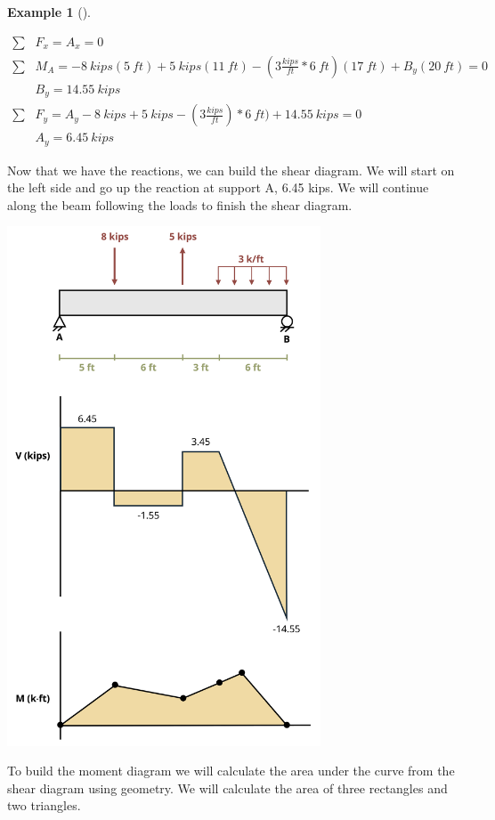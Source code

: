 \documentclass[
  letterpaper,
  DIV=11,
  numbers=noendperiod]{scrreprt}
\theoremstyle{definition}
\newtheorem{example}{Example}[chapter]
\theoremstyle{remark}
\begin{document}
\begin{tcolorbox}
\begin{example}[]
\begin{tcolorbox}
\[
\begin{aligned}
\sum& F_x =A_x =0\\
\sum& M_A =-8{~kips}(5{~ft})+5{~kips}(11{~ft})-(3\frac{kips}{ft}*6{~ft})(17{~ft})+B_y(20{~ft})=0 \\
&B_y =14.55{~kips} \\
\sum& F_y=A_y-8{~kips}+5{~kips}-(3\frac{kips}{ft})*6{~ft})+14.55{~kips}=0 \\
&A_y=6.45{~kips}
\end{aligned}
\]

Now that we have the reactions, we can build the shear diagram. We will
start on the left side and go up the reaction at support A, 6.45 kips.
We will continue along the beam following the loads to finish the shear
diagram.

\begin{center}
\includegraphics[width=3.66667in,height=\textheight]{images/CH9 PNGs/Example 9.3 part 3.png}
\end{center}

To build the moment diagram we will calculate the area under the curve
from the shear diagram using geometry. We will calculate the area of
three rectangles and two triangles.


\end{tcolorbox}
\end{example}
\end{tcolorbox}
\end{document}
